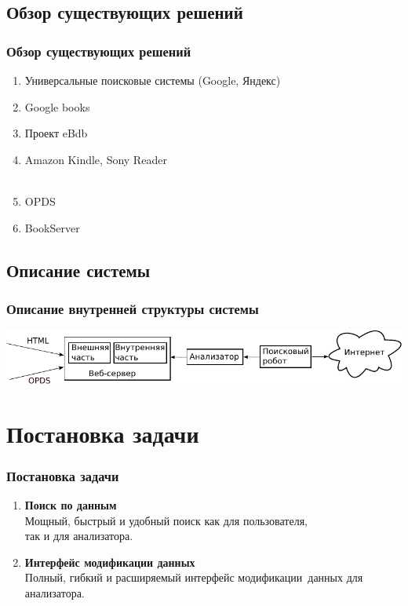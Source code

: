 \documentclass[utf8,handout]{beamer}
\begin{document}
\subsection{Обзор существующих решений}
  \begin{frame}
    \frametitle{Обзор существующих решений}

    \begin{enumerate}
      \item Универсальные поисковые системы (Google, Яндекс)
      \item Google books
      \item Проект eBdb
      \item Amazon Kindle, Sony Reader \\
			~
      \item OPDS
      \item BookServer
    \end{enumerate}
  \end{frame}

\subsection{Описание системы}
	\begin{frame}
		\frametitle{Описание внутренней структуры системы}
		\includegraphics[width=1.05\textwidth]{./head/innerstructure-new}
	\end{frame}

\section{Постановка задачи}
	\begin{frame}
		\frametitle{Постановка задачи}
		\begin{enumerate}
			\item \textbf{Поиск по данным} \\
				Мощный, быстрый и удобный поиск как для пользователя, \\
				так и для анализатора.
			\item \textbf{Интерфейс модификации данных} \\
				Полный, гибкий и расширяемый интерфейс модификации~данных для анализатора.		
		\end{enumerate}
	\end{frame}
\end{document}
